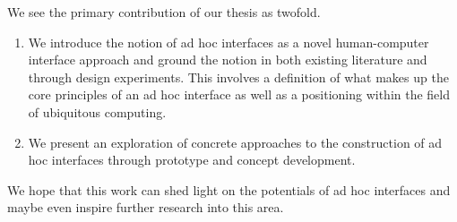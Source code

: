 We see the primary contribution of our thesis as twofold.

\begin{enumerate}
\item{We introduce the notion of ad hoc interfaces as a novel human-computer interface approach and ground the notion in both existing literature and through design experiments. 
This involves a definition of what makes up the core principles of an ad hoc interface as well as a positioning within the field of ubiquitous computing.}

\item{We present an exploration of concrete approaches to the construction of ad hoc interfaces through prototype and concept development.}
\end{enumerate}
We hope that this work can shed light on the potentials of ad hoc interfaces and maybe even inspire further research into this area.